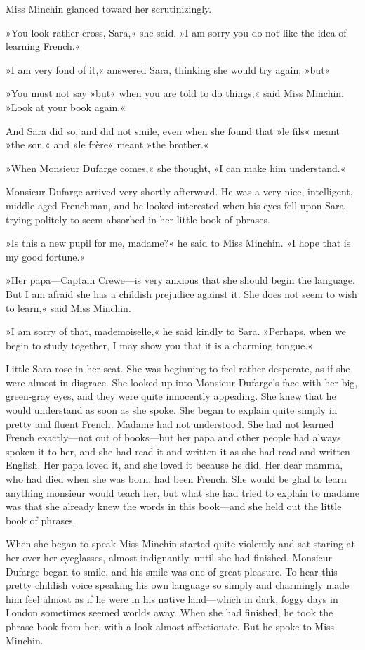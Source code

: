 Miss Minchin glanced toward her scrutinizingly.

»You look rather cross, Sara,« she said. »I am sorry you do not like the idea of learning French.«

»I am very fond of it,« answered Sara, thinking she would try again; »but\longdash«

»You must not say »but« when you are told to do things,« said Miss Minchin. »Look at your book again.«

And Sara did so, and did not smile, even when she found that »le fils« meant »the son,« and »le frère« meant »the brother.«

»When Monsieur Dufarge comes,« she thought, »I can make him understand.«

Monsieur Dufarge arrived very shortly afterward. He was a very nice, intelligent, middle-aged Frenchman, and he looked interested when his eyes fell upon Sara trying politely to seem absorbed in her little book of phrases.

»Is this a new pupil for me, madame?« he said to Miss Minchin. »I hope that is my good fortune.«

»Her papa—Captain Crewe—is very anxious that she should begin the language. But I am afraid she has a childish prejudice against it. She does not seem to wish to learn,« said Miss Minchin.

»I am sorry of that, mademoiselle,« he said kindly to Sara. »Perhaps, when we begin to study together, I may show you that it is a charming tongue.«

Little Sara rose in her seat. She was beginning to feel rather desperate, as if she were almost in disgrace. She looked up into Monsieur Dufarge's face with her big, green-gray eyes, and they were quite innocently appealing. She knew that he would understand as soon as she spoke. She began to explain quite simply in pretty and fluent French. Madame had not understood. She had not learned French exactly—not out of books—but her papa and other people had always spoken it to her, and she had read it and written it as she had read and written English. Her papa loved it, and she loved it because he did. Her dear mamma, who had died when she was born, had been French. She would be glad to learn anything monsieur would teach her, but what she had tried to explain to madame was that she already knew the words in this book—and she held out the little book of phrases.

When she began to speak Miss Minchin started quite violently and sat staring at her over her eyeglasses, almost indignantly, until she had finished. Monsieur Dufarge began to smile, and his smile was one of great pleasure. To hear this pretty childish voice speaking his own language so simply and charmingly made him feel almost as if he were in his native land—which in dark, foggy days in London sometimes seemed worlds away. When she had finished, he took the phrase book from her, with a look almost affectionate. But he spoke to Miss Minchin.

